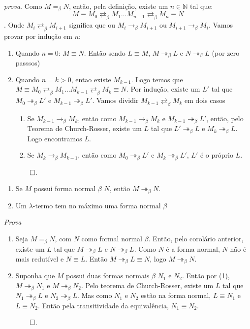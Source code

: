 \documentclass[../main.tex]{subfiles}
\begin{document}
\emph{prova}. Como $M =_{\beta} N$, então, pela definição, existe um $n \in \mathbb{N}$ tal que: $$M \equiv M_0 \rightleftarrows_{\beta} M_1 \dots M_{n-1} \rightleftarrows_{\beta} M_n \equiv N$$. Onde $M_i \rightleftarrows_{\beta} M_{i+1}$ significa que ou $M_i \to_{\beta} M_{i+1}$ ou $M_{i+1} \to_{\beta} M_i$.
Vamos provar por indução em $n$:
\begin{enumerate}
    \item Quando $n = 0$: $M \equiv N$. Então sendo $L \equiv M$, $M \twoheadrightarrow_{\beta} L$ e $N \twoheadrightarrow_{\beta} L$ (por zero passsos)
    \item Quando $n = k > 0$, entao existe $M_{k - 1}$. Logo temos que $M \equiv M_0 \rightleftarrows_{\beta} M_1 \dots M_{k-1} \rightleftarrows_{\beta} M_k \equiv N$.
    Por indução, existe um $L'$ tal que $M_0 \twoheadrightarrow_{\beta} L'$ e $M_{k-1} \twoheadrightarrow_{\beta} L'$. Vamos dividir $M_{k-1} \rightleftarrows_{\beta} M_k $ em dois casos
    \begin{enumerate}
        \item Se  $M_{k-1} \to_{\beta} M_k $, então como $M_{k-1} \to_{\beta} M_k $ e $M_{k-1} \twoheadrightarrow_{\beta} L'$, então, pelo Teorema de Church-Rosser, existe um $L$ tal que $L'\twoheadrightarrow_{\beta} L$ e $M_k \twoheadrightarrow_{\beta} L$. Logo encontramos $L$.
        \item Se $M_k \to_{\beta} M_{k-1}$, então como $M_0 \twoheadrightarrow_{\beta} L'$ e $M_k \twoheadrightarrow_{\beta} L'$, $L'$ é o próprio $L$.
    \end{enumerate}
    $\qed$.
\end{enumerate}

\begin{lemma}
    \hfill
    \begin{enumerate}
        \item Se $M$ possui forma normal $\beta$ $N$, então $M \twoheadrightarrow_{\beta} N$.
        \item Um $\lambda$-termo tem no máximo uma forma normal $\beta$
    \end{enumerate}
\end{lemma}

\emph{Prova}
\begin{enumerate}
    \item Seja $M =_{\beta} N$, com $N$ como formal normal $\beta$. Então, pelo corolário anterior, existe um $L$ tal que $M \twoheadrightarrow_{\beta} L$ e $N \twoheadrightarrow_{\beta} L$. Como $N$ é a forma normal, $N$ não é mais redutível e $N \equiv L$. Então $M \twoheadrightarrow_{\beta} L \equiv N$, logo $M \twoheadrightarrow_{\beta} N$.
    \item Suponha que $M$ possui duas formas normais $\beta$ $N_1$ e $N_2$. Então por (1), $M \twoheadrightarrow_{\beta} N_1$ e $M \twoheadrightarrow_{\beta} N_2$. Pelo teorema de Church-Rosser, existe um $L$ tal que $N_1 \twoheadrightarrow_{\beta} L$ e $N_2 \twoheadrightarrow_{\beta} L$. Mas como $N_1$ e $N_2$ estão na forma normal, $L \equiv N_1$ e $L \equiv N_2$. Então pela transitividade da equivalência, $N_1 \equiv N_2$.
    
    $\qed$.
\end{enumerate}
\end{document}
